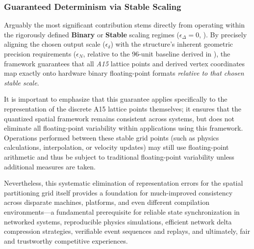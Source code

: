\documentclass[10pt]{article}
\def\AAAB{\textit{A15}}
\begin{document}
\subsubsection{Guaranteed Determinism via Stable Scaling}\label{subsubsec-benefits-determinism}
Arguably the most significant contribution stems directly from operating within the rigorously defined \textbf{Binary} or \textbf{Stable} scaling regimes ($\epsilon_\Delta = 0$, ). By precisely aligning the chosen output scale ($\epsilon_\delta$) with the structure's inherent geometric precision requirements ($\epsilon_N$, relative to the 96-unit baseline derived in ), the framework guarantees that all \AAAB{} lattice points and derived vertex coordinates map exactly onto hardware binary floating-point formats \emph{relative to that chosen stable scale}.

It is important to emphasize that this guarantee applies specifically to the representation of the discrete A15 lattice points themselves; it ensures that the quantized spatial framework remains consistent across systems, but does not eliminate all floating-point variability within applications using this framework. Operations performed between these stable grid points (such as physics calculations, interpolation, or velocity updates) may still use floating-point arithmetic and thus be subject to traditional floating-point variability unless additional measures are taken.

Nevertheless, this systematic elimination of representation errors for the spatial partitioning grid itself provides a foundation for much-improved consistency across disparate machines, platforms, and even different compilation environments—a fundamental prerequisite for reliable state synchronization in networked systems, reproducible physics simulations, efficient network delta compression strategies, verifiable event sequences and replays, and ultimately, fair and trustworthy competitive experiences.
\end{document}

